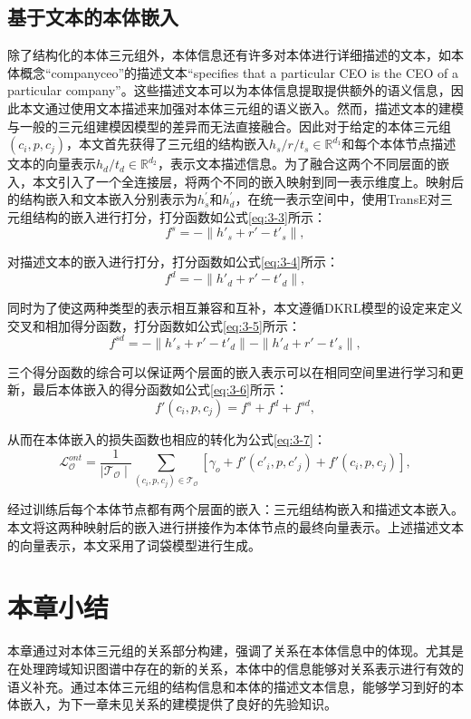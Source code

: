 \subsection{基于文本的本体嵌入}
除了结构化的本体三元组外，本体信息还有许多对本体进行详细描述的文本，如本体概念“companyceo”的描述文本“specifies that a particular CEO is the CEO of a particular company”。这些描述文本可以为本体信息提取提供额外的语义信息，因此本文通过使用文本描述来加强对本体三元组的语义嵌入。然而，描述文本的建模与一般的三元组建模因模型的差异而无法直接融合。因此对于给定的本体三元组\((c_{i},p,c_{j})\)，本文首先获得了三元组的结构嵌入\(h_{s}/r/t_{s} \in \mathbb{R}^{d_{1}}\)和每个本体节点描述文本的向量表示\(h_{d}/t_{d} \in \mathbb{R}^{d_{2}}\)，表示文本描述信息。为了融合这两个不同层面的嵌入，本文引入了一个全连接层，将两个不同的嵌入映射到同一表示维度上。映射后的结构嵌入和文本嵌入分别表示为\(h_{s}^{'}\)和\(h_{d}^{'}\)，在统一表示空间中，使用TransE对三元组结构的嵌入进行打分，打分函数如公式\ref{eq:3-3}所示：
\begin{equation}
  f^{s} = -  \parallel h'_{s} + r' - t'_{s}  \parallel, \label{eq:3-3}
\end{equation}

对描述文本的嵌入进行打分，打分函数如公式\ref{eq:3-4}所示：
\begin{equation}
  f^{d} = -  \parallel h'_{d} + r' - t'_{d}  \parallel, \label{eq:3-4}
\end{equation}

同时为了使这两种类型的表示相互兼容和互补，本文遵循DKRL模型的设定来定义交叉和相加得分函数，打分函数如公式\ref{eq:3-5}所示：
\begin{equation}
  f^{sd} = -  \parallel h'_{s} + r' - t'_{d}  \parallel -  \parallel h'_{d} + r' - t'_{s}  \parallel, \label{eq:3-5}
\end{equation}

三个得分函数的综合可以保证两个层面的嵌入表示可以在相同空间里进行学习和更新，最后本体嵌入的得分函数如公式\ref{eq:3-6}所示：
\begin{equation}
  f'(c_{i},p,c_{j}) = f^{s} + f^{d} +f^{sd}, \label{eq:3-6}
\end{equation}

从而在本体嵌入的损失函数也相应的转化为公式\ref{eq:3-7}：
\begin{equation}
  \mathcal{L}_{\mathcal{O}}^{ont} = \frac{1}{\mid \mathcal{T}_{\mathcal{O}}\mid} \sum_{(c_{i},p,c_{j}) \in \mathcal{T}_{\mathcal{O}}} [\gamma _{o} + f'(c'_{i},p,c'_{j}) + f'(c_{i},p,c_{j})], \label{eq:3-7}
\end{equation}

经过训练后每个本体节点都有两个层面的嵌入：三元组结构嵌入和描述文本嵌入。本文将这两种映射后的嵌入进行拼接作为本体节点的最终向量表示。上述描述文本的向量表示，本文采用了词袋模型进行生成。

\section{本章小结}
本章通过对本体三元组的关系部分构建，强调了关系在本体信息中的体现。尤其是在处理跨域知识图谱中存在的新的关系，本体中的信息能够对关系表示进行有效的语义补充。通过本体三元组的结构信息和本体的描述文本信息，能够学习到好的本体嵌入，为下一章未见关系的建模提供了良好的先验知识。